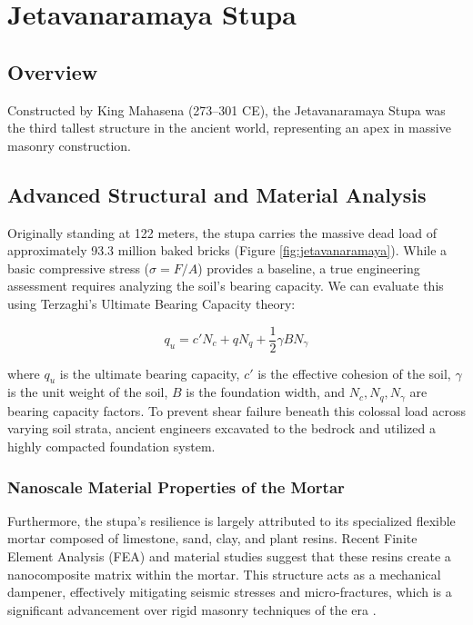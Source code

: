 \documentclass[12pt,a4paper]{report}
\begin{document}
	\chapter{Jetavanaramaya Stupa}
	\section{Overview}
	Constructed by King Mahasena (273–301 CE), the Jetavanaramaya Stupa was the third tallest structure in the ancient world, representing an apex in massive masonry construction.
	
	\section{Advanced Structural and Material Analysis}
	Originally standing at 122 meters, the stupa carries the massive dead load of approximately 93.3 million baked bricks (Figure \ref{fig:jetavanaramaya}). While a basic compressive stress ($\sigma = F/A$) provides a baseline, a true engineering assessment requires analyzing the soil's bearing capacity. We can evaluate this using Terzaghi's Ultimate Bearing Capacity theory:
	
	\begin{equation}
		q_u = c' N_c + q N_q + \frac{1}{2} \gamma B N_\gamma
	\end{equation}
	
	where $q_u$ is the ultimate bearing capacity, $c'$ is the effective cohesion of the soil, $\gamma$ is the unit weight of the soil, $B$ is the foundation width, and $N_c, N_q, N_\gamma$ are bearing capacity factors. To prevent shear failure beneath this colossal load across varying soil strata, ancient engineers excavated to the bedrock and utilized a highly compacted foundation system.
	
	\subsection{Nanoscale Material Properties of the Mortar}
	Furthermore, the stupa's resilience is largely attributed to its specialized flexible mortar composed of limestone, sand, clay, and plant resins. Recent Finite Element Analysis (FEA) and material studies suggest that these resins create a nanocomposite matrix within the mortar. This structure acts as a mechanical dampener, effectively mitigating seismic stresses and micro-fractures, which is a significant advancement over rigid masonry techniques of the era \cite{munasinghe2018}.
	
\end{document}
